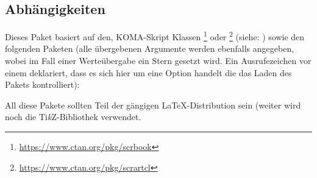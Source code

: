 \documentclass[useartcl,notoc]{sopra-paper}
\begin{document}
\subsection{Abhängigkeiten}
    Dieses Paket basiert auf den, KOMA-Skript Klassen \footnote{\url{https://www.ctan.org/pkg/scrbook}} oder \footnote{\url{https://www.ctan.org/pkg/scrartcl}} (siehe:  )
    sowie den folgenden Paketen (alle übergebenen Argumente werden ebenfalls
    angegeben, wobei im Fall einer Werteübergabe ein Stern gesetzt wird. Ein Ausrufezeichen vor einem  deklariert, dass es sich hier um eine Option handelt die das Laden des Pakets kontrolliert):
    \begin{multicols}{3}
    \end{multicols}
    All diese Pakete sollten Teil der gängigen \LaTeX-Distribution sein (weiter
    wird noch die Ti\textit{k}Z-Bibliothek  verwendet.
\end{document}
